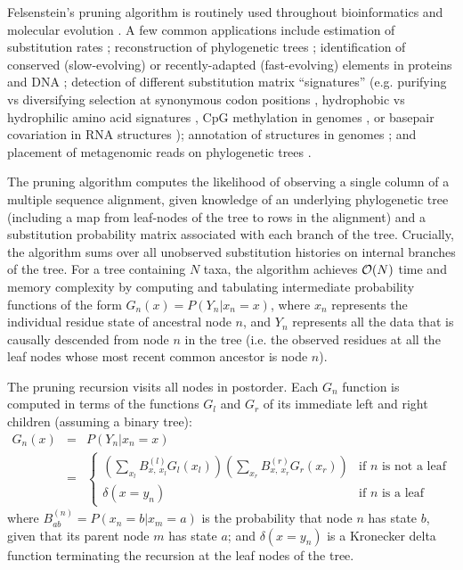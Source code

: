 \documentclass{article}
\begin{document}
Felsenstein's pruning algorithm is routinely used throughout bioinformatics and molecular evolution \cite{Felsenstein81}.
A few common applications include estimation of substitution rates \cite{Yang94b};
reconstruction of phylogenetic trees \cite{RannalaYang96};
identification of conserved (slow-evolving) or recently-adapted (fast-evolving) elements in proteins and DNA \cite{SiepelHaussler04b};
detection of different substitution matrix ``signatures''
(e.g. purifying vs diversifying selection at synonymous codon positions \cite{YangEtAl2000},
hydrophobic vs hydrophilic amino acid signatures \cite{ThorneEtAl96},
CpG methylation in genomes \cite{SiepelHaussler04},
or basepair covariation in RNA structures \cite{KnudsenHein99});
annotation of structures in genomes \cite{SiepelHaussler04c,PedersenEtAl2006};
and placement of metagenomic reads on phylogenetic trees \cite{MatsenEtAl2010}.

The pruning algorithm computes the likelihood of observing a single column of a multiple sequence alignment,
 given knowledge of an underlying phylogenetic tree (including a map from leaf-nodes of the tree to rows in the alignment)
 and a substitution probability matrix associated with each branch of the tree.
Crucially, the algorithm sums over all unobserved substitution histories on internal branches of the tree.
For a tree containing $N$ taxa, the algorithm achieves ${\cal O}(N)$ time and memory complexity by computing and tabulating intermediate probability functions of the form $G_n(x) = P(Y_n|x_n=x)$,
where $x_n$ represents the individual residue state of ancestral node $n$,
and $Y_n$ represents all the data that is causally descended from node $n$ in the tree (i.e. the observed residues at all the leaf nodes whose most recent common ancestor is node $n$).

The pruning recursion visits all nodes in postorder.
Each $G_n$ function is computed in terms of the functions $G_l$ and $G_r$ of its immediate left and right children (assuming a binary tree):
\begin{eqnarray*}
G_n(x) & = & P(Y_n|x_n = x) \\
& = & \left\{
\begin{array}{ll}
\left( \sum_{x_l} B^{(l)}_{x,\ x_l} G_l(x_l) \right) \left( \sum_{x_r} B^{(r)}_{x,\ x_r} G_r(x_r) \right) & \mbox{if $n$ is not a leaf}
 \\
\delta(x=y_n) & \mbox{if $n$ is a leaf}
\end{array}
\right.
\end{eqnarray*}
where $B^{(n)}_{ab} = P(x_n=b|x_m=a)$ is the probability that node $n$ has state $b$, given that its parent node $m$ has state $a$;
and $\delta(x=y_n)$ is a Kronecker delta function terminating the recursion at the leaf nodes of the tree.
\end{document}
